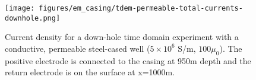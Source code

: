 \begin{figure}
    \begin{center}
    \texttt{[image: figures/em\_casing/tdem-permeable-total-currents-downhole.png]}
    \end{center}
\caption{
    Current density for a down-hole time domain experiment with a conductive, permeable steel-cased well ($5 \times 10^{6}$ S/m, $100\mu_0$).
    The positive electrode is connected to the casing at 950m depth and the return electrode is on the surface at x=1000m.
}
\label{fig:tdem-permeable-total-currents-downhole}
\end{figure}




